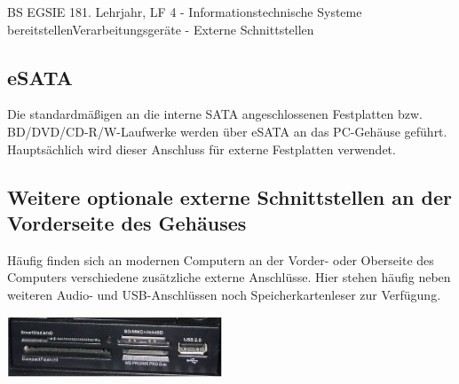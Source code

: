 \documentclass[11pt,oneside,twocolumn,openany,headings=optiontotoc,11pt,numbers=noenddot]{article}
\begin{document}
\begin{worksheet}{BS EGSIE 18}{1. Lehrjahr, LF 4 - Informationstechnische Systeme bereitstellen}{Verarbeitungsgeräte - Externe Schnittstellen}
		\subsection*{eSATA}
		Die standardmäßigen an die interne SATA angeschlossenen Festplatten bzw. BD/DVD/CD-R/W-Laufwerke werden über eSATA an das PC-Gehäuse geführt.\\
		Hauptsächlich wird dieser Anschluss für externe Festplatten verwendet. 
		\subsection*{Weitere optionale externe Schnittstellen an der Vorderseite des Gehäuses}
		Häufig finden sich an modernen Computern an der Vorder- oder Oberseite des Computers verschiedene zusätzliche externe Anschlüsse. Hier stehen häufig neben weiteren Audio- und USB-Anschlüssen noch Speicherkartenleser zur Verfügung.\\
		\par\noindent
		\includegraphics[width=0.48\textwidth]{../99_Bilder/SD.jpg}
	\end{worksheet}
\end{document}
